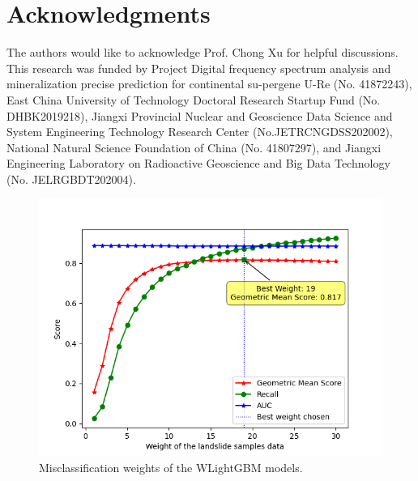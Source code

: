 \documentclass[a4paper,fleqn]{cas-sc}
\begin{document}
\section{Acknowledgments}

The authors would like to acknowledge Prof. Chong Xu for helpful discussions. 
This research was funded by Project Digital frequency spectrum analysis and mineralization precise prediction for continental su-pergene U-Re (No. 41872243), East China University of Technology Doctoral Research Startup Fund (No. DHBK2019218), Jiangxi Provincial Nuclear and Geoscience Data Science and System Engineering Technology Research Center (No.JETRCNGDSS202002), National Natural Science Foundation of China (No. 41807297), and Jiangxi Engineering Laboratory on Radioactive Geoscience and Big Data Technology (No. JELRGBDT202004).

\begin{figure}
  \centering
  \includegraphics[width=12cm]{Definitions/Fig_Weight_LGBM.png}
  \caption{Misclassification weights of the WLightGBM models.}
  \label{Fig_Weight}
\end{figure}
\end{document}
